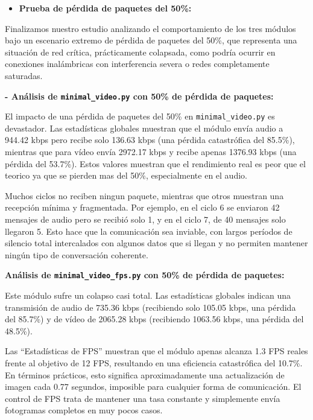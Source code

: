 \begin{itemize}
  \item \textbf{Prueba de pérdida de paquetes del 50\%:}
\end{itemize}

Finalizamos nuestro estudio analizando el comportamiento de los tres módulos bajo un escenario extremo de pérdida de paquetes del 50\%, que representa una situación de red crítica, prácticamente colapsada, como podría ocurrir en conexiones inalámbricas con interferencia severa o redes completamente saturadas.

\vspace{\baselineskip}

\textbf{- Análisis de \texttt{minimal\_video.py} con 50\% de pérdida de paquetes:}
\vspace{\baselineskip}

El impacto de una pérdida de paquetes del 50\% en \texttt{minimal\_video.py} es devastador. Las estadísticas globales muestran que el módulo envía audio a 944.42 kbps pero recibe solo 136.63 kbps (una pérdida catastrófica del 85.5\%), mientras que para vídeo envía 2972.17 kbps y recibe apenas 1376.93 kbps (una pérdida del 53.7\%). Estos valores muestran que el rendimiento real es peor que el teorico ya que se pierden mas del 50\%, especialmente en el audio.
\vspace{\baselineskip}

Muchos ciclos no reciben ningun paquete, mientras que otros muestran una recepción mínima y fragmentada. Por ejemplo, en el ciclo 6 se enviaron 42 mensajes de audio pero se recibió solo 1, y en el ciclo 7, de 40 mensajes solo llegaron 5. Esto hace que la comunicación sea inviable, con largos períodos de silencio total intercalados con algunos datos que si llegan y no permiten mantener ningún tipo de conversación coherente.

\vspace{\baselineskip}

\textbf{Análisis de \texttt{minimal\_video\_fps.py} con 50\% de pérdida de paquetes:}
\vspace{\baselineskip}

Este módulo sufre un colapso casi total. Las estadísticas globales indican una transmisión de audio de 735.36 kbps (recibiendo solo 105.05 kbps, una pérdida del 85.7\%) y de vídeo de 2065.28 kbps (recibiendo 1063.56 kbps, una pérdida del 48.5\%).

Las ``Estadísticas de FPS'' muestran que el módulo apenas alcanza 1.3 FPS reales frente al objetivo de 12 FPS, resultando en una eficiencia catastrófica del 10.7\%. En términos prácticos, esto significa aproximadamente una actualización de imagen cada 0.77 segundos, imposible para cualquier forma de comunicación. El control de FPS trata de mantener una tasa constante y simplemente envía fotogramas completos en muy pocos casos.

